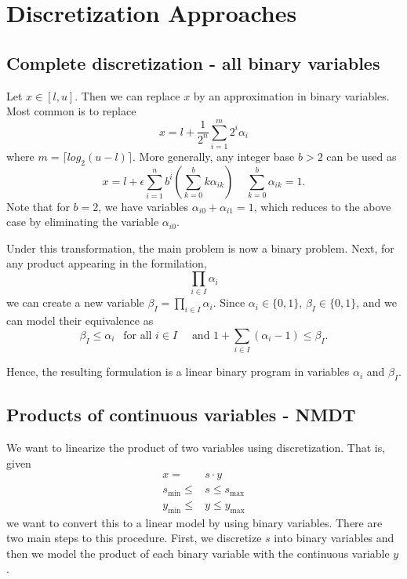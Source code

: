 \chapter{Discretization Approaches}

\section{Complete discretization - all binary variables}
Let $x \in [l,u]$.  Then we can replace $x$ by an approximation in binary variables.  Most common is to replace
\begin{equation}
x = l +  \frac{1}{2^n} \sum_{i=1}^m 2^i \alpha_{i}
\end{equation}
where $m = \lceil log_2(u-l) \rceil$.  More generally, any integer base $b > 2$ can be used as 
\begin{equation}
x = l + \epsilon \sum_{i=1}^n b^i \left(\sum_{k=0}^b k \alpha_{ik}\right) \ \ \ \ \ \sum_{k=0}^b \alpha_{ik} = 1.
\end{equation}
Note that for $b=2$, we have variables $\alpha_{i0} + \alpha_{i1} = 1$, which reduces to the above case by eliminating the variable $\alpha_{i0}$.


Under this transformation, the main problem is now a binary problem.  Next, for any product appearing in the formilation,
$$
\prod_{i \in I} \alpha_i
$$
we can create a new variable $\beta_I = \prod_{i \in I} \alpha_i$.  Since $\alpha_i \in \{0,1\}$, $\beta_I \in \{0,1\}$, and we can model their equivalence as
\begin{equation}
\beta_I \leq \alpha_i  \ \ \text{ for all } i \in I \quad \text{ and } 1 + \sum_{i \in I} (\alpha_i-1) \leq \beta_I.
\end{equation}

Hence, the resulting formulation is a linear binary program in variables $\alpha_i$ and $\beta_I$.



\section{Products of continuous variables - NMDT}
We want to linearize the product of two variables using discretization.  That is, given 
\begin{equation}
\begin{split}
x =& s \cdot y\\
s_{\min} \leq &s \leq s_{\max}\\
y_{\min} \leq &y \leq y_{\max}
\end{split}
\end{equation}
we want to convert this to a linear model by using binary variables.  There are two main steps to this procedure.  First, we discretize $s$ into binary variables and then we model the product of each binary variable with the continuous variable $y$.

